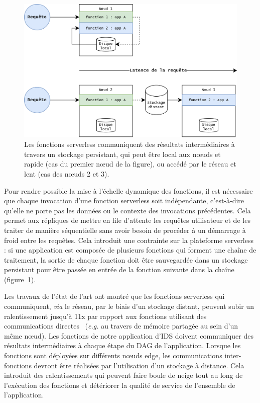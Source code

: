 \begin{figure}[!ht]
    \centering
    \includegraphics[width=0.8\columnwidth]{5_Chapitre5/figures/function-communications.png}
    \caption{Les fonctions serverless communiquent des résultats intermédiaires à travers un stockage persistant, qui peut être local aux nœuds et rapide (cas du premier nœud de la figure), ou accédé par le réseau et lent (cas des nœuds 2 et 3).}
    \label{figure:herocache-function-communications}
\end{figure}

Pour rendre possible la mise à l'échelle dynamique des fonctions, il est nécessaire que chaque invocation d'une fonction serverless soit indépendante, c'est-à-dire qu'elle ne porte pas les données ou le contexte des invocations précédentes. Cela permet aux répliques de mettre en file d'attente les requêtes utilisateur et de les traiter de manière séquentielle sans avoir besoin de procéder à un démarrage à froid entre les requêtes. Cela introduit une contrainte sur la plateforme serverless : si une application est composée de plusieurs fonctions qui forment une chaîne de traitement, la sortie de chaque fonction doit être sauvegardée dans un stockage persistant pour être passée en entrée de la fonction suivante dans la chaîne~\cite{mullerLambadaInteractiveData2020} (figure~\ref{figure:herocache-function-communications}).

Les travaux de l'état de l'art ont montré que les fonctions serverless qui communiquent, \textit{via} le réseau, par le biais d'un stockage distant, peuvent subir un ralentissement jusqu'à 11x par rapport aux fonctions utilisant des communications directes~\cite{wawrzoniakBoxerDataAnalytics2021a} (\textit{e.g.} au travers de mémoire partagée au sein d'un même nœud). Les fonctions de notre application d'IDS doivent communiquer des résultats intermédiaires à chaque étape du DAG de l'application. Lorsque les fonctions sont déployées sur différents nœuds edge, les communications inter-fonctions devront être réalisées par l'utilisation d'un stockage à distance. Cela introduit des ralentissements qui peuvent faire boule de neige tout au long de l'exécution des fonctions et détériorer la qualité de service de l'ensemble de l'application.

